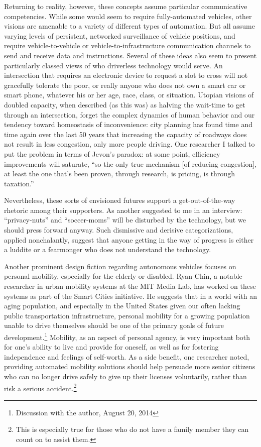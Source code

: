 Returning to reality, however, these concepts assume particular
communicative competencies. While 
some would seem to require fully-automated vehicles, other
visions are amenable to a variety of different types of automation.
But all assume varying levels of persistent, networked surveillance of
vehicle positions, and require vehicle-to-vehicle or
vehicle-to-infrastructure communication channels to send and receive
data and instructions. Several of these ideas also seem to present
particularly classed views of who driverless technology would serve.
An intersection that requires an electronic device to request a slot
to cross will not gracefully tolerate the poor, or really anyone who
does not own a smart car or smart phone, whatever his or her age,
race, class, or situation. Utopian visions of doubled capacity, when
described (as this was) as halving the wait-time to get through an
intersection, forget the complex dynamics of human behavior and our
tendency toward homeostasis of inconvenience: city planning has found
time and time again over the last 50 years that increasing the
capacity of roadways does not result in less congestion, only more
people driving.\cite[p. 219]{marshallFuture} One researcher I talked
to put the problem in terms of Jevon's paradox: at some point,
efficiency improvements will saturate, ``so the only true mechanism
[of reducing congestion],
at least the one that's been proven, through research, is pricing, is
through taxation.''

Nevertheless, these
sorts of envisioned futures support a get-out-of-the-way rhetoric
among their supporters. As another suggested to me in an interview:
``privacy-nuts'' and ``soccer-moms'' will be disturbed by the
technology, but we should press forward anyway. Such dismissive and
derisive categorizations, applied nonchalantly, suggest that anyone
getting in the way of progress is either a luddite or a fearmonger who
does not understand the technology. 

Another prominent design fiction regarding autonomous vehicles focuses
on personal mobility, especially for the elderly or disabled. Ryan
Chin, a notable researcher in urban mobility systems at the MIT Media
Lab, has worked on these systems as part of the Smart Cities
initiative. He suggests that in a world with an aging population, and
especially in the United States given our often lacking public
transportation infrastructure, personal mobility for a growing
population unable to drive themselves should be one of the primary
goals of future development.\footnote{Discussion with the author,
  August 20, 2014} Mobility, as an aspect of personal agency, is very important both
for one's ability to live and provide for oneself, as well as for
fostering independence and feelings of self-worth. As a side benefit,
one researcher noted, providing automated mobility solutions should
help persuade more senior citizens who can no longer drive safely to
give up their licenses voluntarily, rather than risk a serious
accident.\footnote{This is especially true for those who do not have a
  family member they can count on to assist them.}

